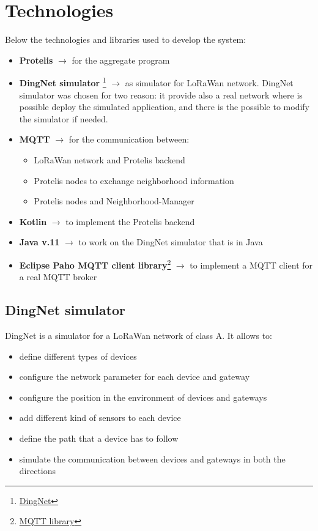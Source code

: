 \chapter{Technologies}

Below the technologies and libraries used to develop the system:

\begin{itemize}
    \item \textbf{Protelis} $\rightarrow$ for the aggregate program
    \item \textbf{DingNet simulator} \footnote{\href{https://github.com/dimoibiehg/DingNet}{DingNet}} $\rightarrow$  as simulator for LoRaWan network. DingNet simulator was chosen for two reason: it provide also a real network where is possible deploy the simulated application, and there is the possible to modify the simulator if needed.  
    \item \textbf{MQTT} $\rightarrow$ for the communication between:
    \begin{itemize}
        \item LoRaWan network and Protelis backend
        \item Protelis nodes to exchange neighborhood information
        \item Protelis nodes and Neighborhood-Manager
    \end{itemize}
    \item \textbf{Kotlin} $\rightarrow$ to implement the Protelis backend
    \item \textbf{Java v.11} $\rightarrow$ to work on the DingNet simulator that is in Java
    \item \textbf{Eclipse Paho MQTT client library}\footnote{\href{https://github.com/eclipse/paho.mqtt.java}{MQTT library}} $\rightarrow$ to implement a MQTT client for a real MQTT broker
\end{itemize}

\section{DingNet simulator}
DingNet is a simulator for a LoRaWan network of class A. It allows to:
\begin{itemize}
    \item define different types of devices
    \item configure the network parameter for each device and gateway
    \item configure the position in the environment of devices and gateways
    \item add different kind of sensors to each device 
    \item define the path that a device has to follow
    \item simulate the communication between devices and gateways in both the directions
\end{itemize}

